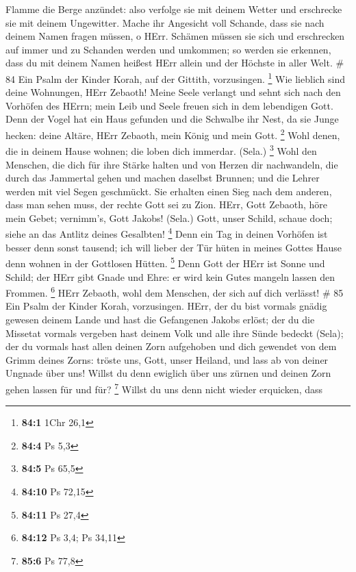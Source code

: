 Flamme die Berge anzündet:  also verfolge sie mit deinem
Wetter und erschrecke sie mit deinem Ungewitter.  Mache ihr
Angesicht voll Schande, dass sie nach deinem Namen fragen müssen, o
HErr.  Schämen müssen sie sich und erschrecken auf immer
und zu Schanden werden und umkommen;  so werden sie
erkennen, dass du mit deinem Namen heißest HErr allein und der Höchste
in aller Welt. \# 84  Ein Psalm der Kinder Korah, auf der
Gittith, vorzusingen. \footnote{\textbf{84:1} 1Chr 26,1} 
Wie lieblich sind deine Wohnungen, HErr Zebaoth!  Meine
Seele verlangt und sehnt sich nach den Vorhöfen des HErrn; mein Leib und
Seele freuen sich in dem lebendigen Gott.  Denn der Vogel
hat ein Haus gefunden und die Schwalbe ihr Nest, da sie Junge hecken:
deine Altäre, HErr Zebaoth, mein König und mein Gott. \footnote{\textbf{84:4}
  Ps 5,3}  Wohl denen, die in deinem Hause wohnen; die loben
dich immerdar. (Sela.) \footnote{\textbf{84:5} Ps 65,5} 
Wohl den Menschen, die dich für ihre Stärke halten und von Herzen dir
nachwandeln,  die durch das Jammertal gehen und machen
daselbst Brunnen; und die Lehrer werden mit viel Segen geschmückt.
 Sie erhalten einen Sieg nach dem anderen, dass man sehen
muss, der rechte Gott sei zu Zion.  HErr, Gott Zebaoth, höre
mein Gebet; vernimm's, Gott Jakobs! (Sela.)  Gott, unser
Schild, schaue doch; siehe an das Antlitz deines Gesalbten! \footnote{\textbf{84:10}
  Ps 72,15}  Denn ein Tag in deinen Vorhöfen ist besser
denn sonst tausend; ich will lieber der Tür hüten in meines Gottes Hause
denn wohnen in der Gottlosen Hütten. \footnote{\textbf{84:11} Ps 27,4}
 Denn Gott der HErr ist Sonne und Schild; der HErr gibt
Gnade und Ehre: er wird kein Gutes mangeln lassen den Frommen.
\footnote{\textbf{84:12} Ps 3,4; Ps 34,11}  HErr Zebaoth,
wohl dem Menschen, der sich auf dich verlässt! \# 85  Ein
Psalm der Kinder Korah, vorzusingen.  HErr, der du bist
vormals gnädig gewesen deinem Lande und hast die Gefangenen Jakobs
erlöst;  der du die Missetat vormals vergeben hast deinem
Volk und alle ihre Sünde bedeckt (Sela);  der du vormals
hast allen deinen Zorn aufgehoben und dich gewendet von dem Grimm deines
Zorns:  tröste uns, Gott, unser Heiland, und lass ab von
deiner Ungnade über uns!  Willst du denn ewiglich über uns
zürnen und deinen Zorn gehen lassen für und für? \footnote{\textbf{85:6}
  Ps 77,8}  Willst du uns denn nicht wieder erquicken, dass
